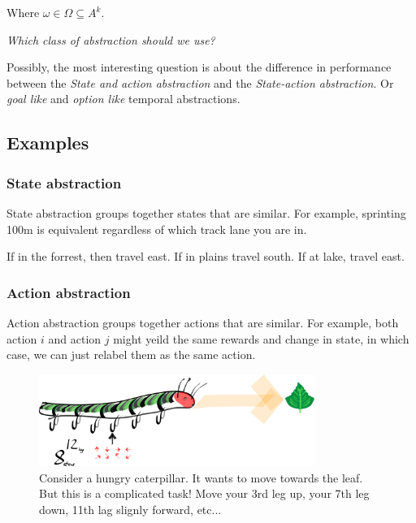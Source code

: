 Where $\omega \in \Omega \subseteq A^k$.


\begin{displayquote}
\textit{Which class of abstraction should we use?}
\end{displayquote}

Possibly, the most interesting question is about the difference in performance between
the \textit{State and action abstraction} and the \textit{State-action abstraction}.
Or \textit{goal like} and \textit{option like} temporal abstractions.

\subsection{Examples}

\subsubsection{State abstraction}

State abstraction groups together states that are similar. For example,
sprinting 100m is equivalent regardless of which track lane you are in.

If in the forrest, then travel east. If in plains travel south. If at lake, travel east.


\subsubsection{Action abstraction}

Action abstraction groups together actions that are similar. For
example, both action $i$ and action $j$ might yeild the same rewards and change in state,
in which case, we can just relabel them as the same action.

\begin{figure}[h!]
\centering
\includegraphics[width=0.8\textwidth,height=0.2\textheight]{../../pictures/drawings/hungry-caterpillar.png}
\caption{Consider a hungry caterpillar. It wants to move towards the leaf. But this is a complicated task! Move your 3rd leg up, your 7th leg down, 11th lag slignly forward, etc...}
\end{figure}


